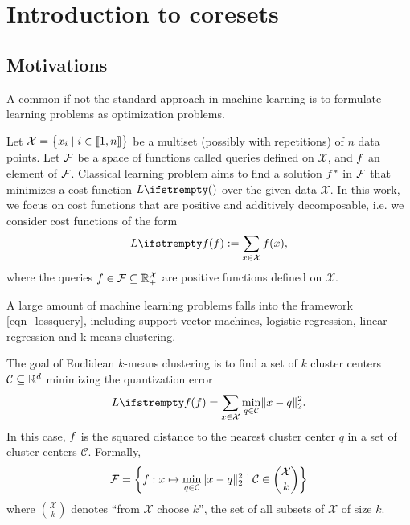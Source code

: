 
\chapter{Introduction to coresets}
\label{chap_intro_coresets}
\section{Motivations}


A common if not the standard approach in machine learning
is to formulate learning problems as optimization problems.

Let $\mathcal{X}=\begin{Bmatrix}
x_{i} \mid i\in \llbracket 1,n \rrbracket
\end{Bmatrix}$ be a multiset (possibly with repetitions) of $n$ data points. Let $\mathcal{F}$ be a space of functions called queries defined on $\mathcal{X}$, and $f$ an element of $\mathcal{F}$. Classical learning problem aims to find a solution $f ^*$ in $\mathcal{F}$ that minimizes a cost function $\loss{}$ over the given data $\mathcal{X}$. In this work, we focus on cost functions that are positive and additively decomposable, i.e. we consider cost functions of the form
\begin{equation}
    \label{eqn_lossquery}
\loss{\query}:=\sum_{x \in \mathcal{X}} \query (x),
\end{equation}
where the queries $f \in \mathcal{F} \subseteq \mathbb{R}_+^{\mathcal{X}}$ are positive functions defined on $\mathcal{X}$.

A large amount of machine learning problems falls into the framework \cref{eqn_lossquery}, including support vector machines, logistic regression, linear regression and k-means clustering. 
\begin{example}[$k$-means]  
    The goal of Euclidean $k$-means clustering is to find a set of $k$ cluster centers $\mathcal{C}\subseteq \mathbb{R}^d$ minimizing the quantization error
    \begin{equation*}
    \loss{\query} = \sum_{x \in \mathcal{X}} \min_{q \in \mathcal{C} } \lVert x - q \rVert^2_2.
    \end{equation*}
    In this case, $f$ is the squared distance to the nearest cluster center $q$ in a set of cluster centers $\mathcal{C}$. Formally, 
    \begin{equation*}
        \mathcal{F} = \left\{f : x \mapsto \min_{q \in \mathcal{C} } \lVert x - q \rVert^2_2 \mid \mathcal{C}  \in \binom{\mathcal{X}}{k}\right\}   
    \end{equation*}
    where $\binom{\mathcal{X}}{k}$ denotes ``from $\mathcal{X}$ choose $k$'', the set of all subsets of $\mathcal{X}$ of size $k$.
\end{example}

